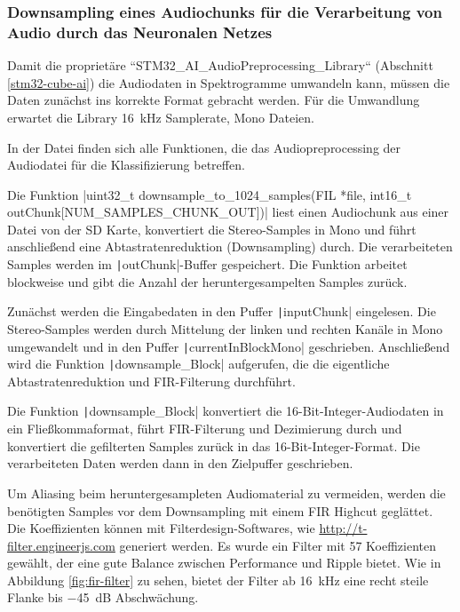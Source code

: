 \subsubsection{Downsampling eines Audiochunks für die Verarbeitung von Audio durch das Neuronalen Netzes}
\label{sec:audio-downsampling}


Damit die proprietäre ``STM32\_AI\_AudioPreprocessing\_Library`` (Abschnitt \ref{stm32-cube-ai}) die Audiodaten in Spektrogramme umwandeln kann, müssen die Daten zunächst ins korrekte Format gebracht werden. Für die Umwandlung erwartet die Library \SI{16}{\kilo\hertz} Samplerate, Mono Dateien.

In der Datei
finden sich alle Funktionen, die das Audiopreprocessing der Audiodatei für die Klassifizierung betreffen.

Die Funktion 
|uint32_t downsample_to_1024_samples(FIL *file, int16_t outChunk[NUM_SAMPLES_CHUNK_OUT])|
liest einen Audiochunk aus einer Datei von der SD Karte, konvertiert die Stereo-Samples in Mono und führt anschließend eine Abtastratenreduktion (Downsampling) durch. Die verarbeiteten Samples werden im \texttt|outChunk|-Buffer gespeichert. Die Funktion arbeitet blockweise und gibt die Anzahl der heruntergesampelten Samples zurück. 

Zunächst werden die Eingabedaten in den Puffer \texttt|inputChunk| eingelesen. Die Stereo-Samples werden durch Mittelung der linken und rechten Kanäle in Mono umgewandelt und in den Puffer \texttt|currentInBlockMono| geschrieben. Anschließend wird die Funktion \texttt|downsample_Block| aufgerufen, die die eigentliche Abtastratenreduktion und FIR-Filterung durchführt.

Die Funktion \texttt|downsample_Block| konvertiert die 16-Bit-Integer-Audiodaten in ein Fließkommaformat, führt FIR-Filterung und Dezimierung durch und konvertiert die gefilterten Samples zurück in das 16-Bit-Integer-Format. Die verarbeiteten Daten werden dann in den Zielpuffer geschrieben.

Um Aliasing beim heruntergesampleten Audiomaterial zu vermeiden, werden die benötigten Samples vor dem Downsampling mit einem FIR Highcut geglättet. 
Die Koeffizienten können mit Filterdesign-Softwares, wie \url{http://t-filter.engineerjs.com} generiert werden. Es wurde ein Filter mit 57 Koeffizienten gewählt, der eine gute Balance zwischen Performance und Ripple bietet. 
Wie in Abbildung \ref{fig:fir-filter} zu sehen, bietet der Filter ab \SI{16}{\kilo\hertz} eine recht steile Flanke bis \SI{-45}{\deci\bel} Abschwächung.

